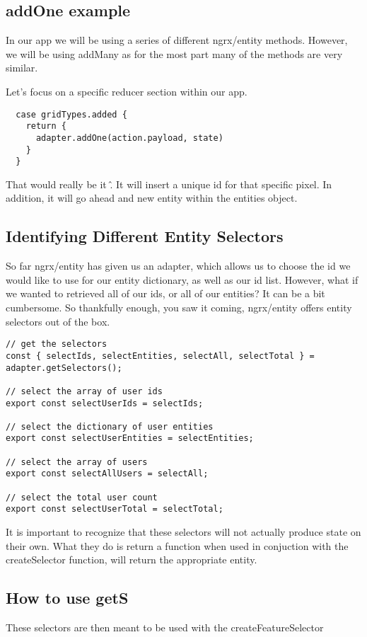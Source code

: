 \subsection{ addOne example }
In our app we will be using a series of different ngrx/entity methods. However,
we will be using addMany as for the most part many of the methods are very
similar.

Let's focus on a specific reducer section within our app.
\begin{verbatim}
  case gridTypes.added {
    return {
      adapter.addOne(action.payload, state)
    }
  }
\end{verbatim}

That would really be it \^. It will insert a unique id for that specific pixel.
In addition, it will go ahead and new entity within the entities object.

\subsection{ Identifying Different Entity Selectors }
So far ngrx/entity has given us an adapter, which allows us to choose the id
we would like to use for our entity dictionary, as well as our id list. However,
what if we wanted to retrieved all of our ids, or all of our entities? It can
be a bit cumbersome. So thankfully enough, you saw it coming, ngrx/entity
offers entity selectors out of the box.

\begin{verbatim}
// get the selectors
const { selectIds, selectEntities, selectAll, selectTotal } = adapter.getSelectors();

// select the array of user ids
export const selectUserIds = selectIds;

// select the dictionary of user entities
export const selectUserEntities = selectEntities;

// select the array of users
export const selectAllUsers = selectAll;

// select the total user count
export const selectUserTotal = selectTotal;
\end{verbatim}

It is important to recognize that these selectors will not actually produce
state on their own. What they do is return a function when used in
conjuction with the createSelector function, will return the appropriate
entity.

\subsection{ How to use getS }
These selectors are then meant to be used with the createFeatureSelector

